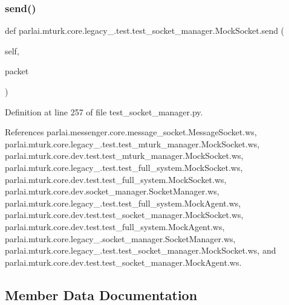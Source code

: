 \subsubsection{\texorpdfstring{send()}{send()}}
{\footnotesize\ttfamily def parlai.\+mturk.\+core.\+legacy\+\_.\+test.\+test\+\_\+socket\+\_\+manager.\+Mock\+Socket.\+send (\begin{DoxyParamCaption}\item[{}]{self,  }\item[{}]{packet }\end{DoxyParamCaption})}



Definition at line 257 of file test\+\_\+socket\+\_\+manager.\+py.



References parlai.\+messenger.\+core.\+message\+\_\+socket.\+Message\+Socket.\+ws, parlai.\+mturk.\+core.\+legacy\+\_.\+test.\+test\+\_\+mturk\+\_\+manager.\+Mock\+Socket.\+ws, parlai.\+mturk.\+core.\+dev.\+test.\+test\+\_\+mturk\+\_\+manager.\+Mock\+Socket.\+ws, parlai.\+mturk.\+core.\+legacy\+\_.\+test.\+test\+\_\+full\+\_\+system.\+Mock\+Socket.\+ws, parlai.\+mturk.\+core.\+dev.\+test.\+test\+\_\+full\+\_\+system.\+Mock\+Socket.\+ws, parlai.\+mturk.\+core.\+dev.\+socket\+\_\+manager.\+Socket\+Manager.\+ws, parlai.\+mturk.\+core.\+legacy\+\_.\+test.\+test\+\_\+full\+\_\+system.\+Mock\+Agent.\+ws, parlai.\+mturk.\+core.\+dev.\+test.\+test\+\_\+socket\+\_\+manager.\+Mock\+Socket.\+ws, parlai.\+mturk.\+core.\+dev.\+test.\+test\+\_\+full\+\_\+system.\+Mock\+Agent.\+ws, parlai.\+mturk.\+core.\+legacy\+\_.\+socket\+\_\+manager.\+Socket\+Manager.\+ws, parlai.\+mturk.\+core.\+legacy\+\_.\+test.\+test\+\_\+socket\+\_\+manager.\+Mock\+Socket.\+ws, and parlai.\+mturk.\+core.\+dev.\+test.\+test\+\_\+socket\+\_\+manager.\+Mock\+Agent.\+ws.



\subsection{Member Data Documentation}
\mbox{\label{classparlai_1_1mturk_1_1core_1_1legacy__2018_1_1test_1_1test__socket__manager_1_1MockSocket_a63b985c345fee8fa14cd8bdf688fe20b}} 
